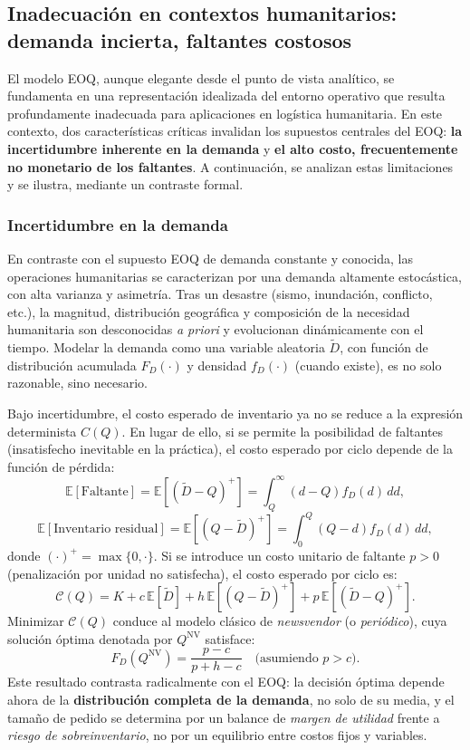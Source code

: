 \documentclass[
  spanish,
  us-letterpaper,
]{scrreprt}
\numberwithin{equation}{section}
\begin{document}
\subsection{Inadecuación en contextos humanitarios: demanda incierta,
faltantes
costosos}\label{inadecuaciuxf3n-en-contextos-humanitarios-demanda-incierta-faltantes-costosos}

El modelo EOQ, aunque elegante desde el punto de vista analítico, se
fundamenta en una representación idealizada del entorno operativo que
resulta profundamente inadecuada para aplicaciones en logística
humanitaria. En este contexto, dos características críticas invalidan
los supuestos centrales del EOQ: \textbf{la incertidumbre inherente en
la demanda} y \textbf{el alto costo, frecuentemente no monetario de los
faltantes}. A continuación, se analizan estas limitaciones y se ilustra,
mediante un contraste formal.

\subsubsection{Incertidumbre en la
demanda}\label{incertidumbre-en-la-demanda}

En contraste con el supuesto EOQ de demanda constante y conocida, las
operaciones humanitarias se caracterizan por una demanda altamente
estocástica, con alta varianza y asimetría. Tras un desastre (sismo,
inundación, conflicto, etc.), la magnitud, distribución geográfica y
composición de la necesidad humanitaria son desconocidas \emph{a priori}
y evolucionan dinámicamente con el tiempo. Modelar la demanda como una
variable aleatoria \(\tilde{D}\), con función de distribución acumulada
\(F_D(\cdot)\) y densidad \(f_D(\cdot)\) (cuando existe), es no solo
razonable, sino necesario.

Bajo incertidumbre, el costo esperado de inventario ya no se reduce a la
expresión determinista \(C(Q)\). En lugar de ello, si se permite la
posibilidad de faltantes (insatisfecho inevitable en la práctica), el
costo esperado por ciclo depende de la función de pérdida: \[
\mathbb{E}[\text{Faltante}] = \mathbb{E}[(\tilde{D} - Q)^+] = \int_Q^\infty (d - Q) f_D(d) \, dd,
\] \[
\mathbb{E}[\text{Inventario residual}] = \mathbb{E}[(Q - \tilde{D})^+] = \int_0^Q (Q - d) f_D(d) \, dd,
\] donde \((\cdot)^+ = \max\{0, \cdot\}\). Si se introduce un costo
unitario de faltante \(p > 0\) (penalización por unidad no satisfecha),
el costo esperado por ciclo es: \[
\mathcal{C}(Q) = K + c \, \mathbb{E}[\tilde{D}] + h \, \mathbb{E}[(Q - \tilde{D})^+] + p \, \mathbb{E}[(\tilde{D} - Q)^+].
\] Minimizar \(\mathcal{C}(Q)\) conduce al modelo clásico de
\emph{newsvendor} (o \emph{periódico}), cuya solución óptima denotada
por \(Q^{\text{NV}}\) satisface: \[
F_D(Q^{\text{NV}}) = \frac{p - c}{p + h - c} \quad \text{(asumiendo } p > c\text{)}.
\] Este resultado contrasta radicalmente con el EOQ: la decisión óptima
depende ahora de la \textbf{distribución completa de la demanda}, no
solo de su media, y el tamaño de pedido se determina por un balance de
\emph{margen de utilidad} frente a \emph{riesgo de sobreinventario}, no
por un equilibrio entre costos fijos y variables.
\end{document}
